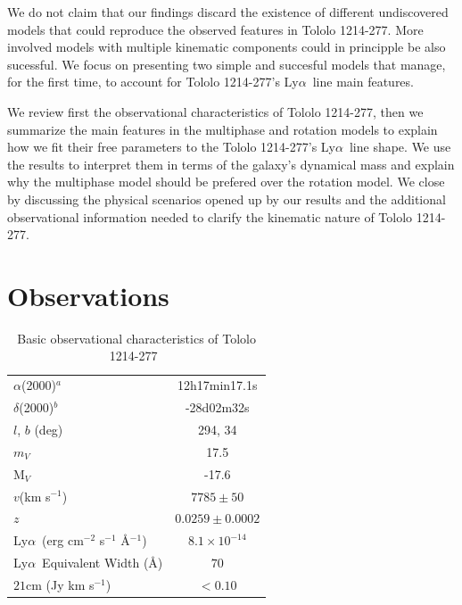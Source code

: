 \documentclass[a4,useAMS,usenatbib,usegraphicx]{mn2e}
\newcommand{\tol}{Tololo 1214-277}
\newcommand{\lya}{Ly$\alpha$}
\begin{document}
We do not claim that our findings discard the existence of different
undiscovered models that could reproduce the observed features in \tol.
More involved models with multiple kinematic components could
in principple be also sucessful.
We focus on presenting two simple and succesful models that
manage, for the first time, to account for \tol's \lya\ line main
features. 

We review first the observational characteristics of
\tol, then we summarize the main features in the multiphase and
rotation models to explain how we fit their free parameters 
to the \tol's \lya\ line shape.
We use the results to interpret them in terms of the galaxy's
dynamical mass and explain why the multiphase model should be prefered
over the rotation model.
We close by discussing the physical scenarios opened up by our
results and the additional observational information needed to clarify
the kinematic nature of \tol.


\section{Observations}


\begin{table}
\begin{center}
\begin{tabular}{lc}\hline
$\alpha$(2000)$^{a}$ & 12h17min17.1s\\
$\delta$(2000)$^{b}$ & -28d02m32s\\
$l$, $b$ (deg) & 294, 34\\
$m_V$ & 17.5\\
  M$_V$ & -17.6\\ 
$v$(km s$^{-1}$) & $7785\pm 50$\\
$z$ & $0.0259\pm0.0002$ \\
\lya\ (erg cm$^{-2}$ s$^{-1}$ \AA$^{-1}$)& $8.1\times 10^{-14}$ \\
\lya\ Equivalent Width (\AA) & $70$\\
$21$cm (Jy km s$^{-1}$)& $<0.10$ \\\hline
\end{tabular}
\end{center}
\caption{Basic observational characteristics of \tol\ 
  \citep{Thuan97}\label{obstable}} 
\end{table}
\end{document}
